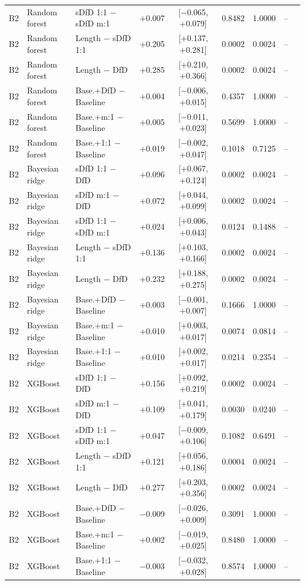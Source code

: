 \begin{longtable}{lllcccccc}
B2 & Random forest & sDfD 1:1 $-$ sDfD m:1 & +0.007 & [$-$0.065, +0.079] & 0.8482 & 1.0000 & -- \\
B2 & Random forest & Length $-$ sDfD 1:1 & +0.205 & [+0.137, +0.281] & 0.0002 & 0.0024 & -- \\
B2 & Random forest & Length $-$ DfD & +0.285 & [+0.210, +0.366] & 0.0002 & 0.0024 & -- \\
B2 & Random forest & Base.+DfD $-$ Baseline & +0.004 & [$-$0.006, +0.015] & 0.4357 & 1.0000 & -- \\
B2 & Random forest & Base.+m:1 $-$ Baseline & +0.005 & [$-$0.011, +0.023] & 0.5699 & 1.0000 & -- \\
B2 & Random forest & Base.+1:1 $-$ Baseline & +0.019 & [$-$0.002, +0.047] & 0.1018 & 0.7125 & -- \\
B2 & Bayesian ridge & sDfD 1:1 $-$ DfD & +0.096 & [+0.067, +0.124] & 0.0002 & 0.0024 & -- \\
B2 & Bayesian ridge & sDfD m:1 $-$ DfD & +0.072 & [+0.044, +0.099] & 0.0002 & 0.0024 & -- \\
B2 & Bayesian ridge & sDfD 1:1 $-$ sDfD m:1 & +0.024 & [+0.006, +0.043] & 0.0124 & 0.1488 & -- \\
B2 & Bayesian ridge & Length $-$ sDfD 1:1 & +0.136 & [+0.103, +0.166] & 0.0002 & 0.0024 & -- \\
B2 & Bayesian ridge & Length $-$ DfD & +0.232 & [+0.188, +0.275] & 0.0002 & 0.0024 & -- \\
B2 & Bayesian ridge & Base.+DfD $-$ Baseline & +0.003 & [$-$0.001, +0.007] & 0.1666 & 1.0000 & -- \\
B2 & Bayesian ridge & Base.+m:1 $-$ Baseline & +0.010 & [+0.003, +0.017] & 0.0074 & 0.0814 & -- \\
B2 & Bayesian ridge & Base.+1:1 $-$ Baseline & +0.010 & [+0.002, +0.017] & 0.0214 & 0.2354 & -- \\
B2 & XGBoost & sDfD 1:1 $-$ DfD & +0.156 & [+0.092, +0.219] & 0.0002 & 0.0024 & -- \\
B2 & XGBoost & sDfD m:1 $-$ DfD & +0.109 & [+0.041, +0.179] & 0.0030 & 0.0240 & -- \\
B2 & XGBoost & sDfD 1:1 $-$ sDfD m:1 & +0.047 & [$-$0.009, +0.106] & 0.1082 & 0.6491 & -- \\
B2 & XGBoost & Length $-$ sDfD 1:1 & +0.121 & [+0.056, +0.186] & 0.0004 & 0.0024 & -- \\
B2 & XGBoost & Length $-$ DfD & +0.277 & [+0.203, +0.356] & 0.0002 & 0.0024 & -- \\
B2 & XGBoost & Base.+DfD $-$ Baseline & $-$0.009 & [$-$0.026, +0.009] & 0.3091 & 1.0000 & -- \\
B2 & XGBoost & Base.+m:1 $-$ Baseline & +0.002 & [$-$0.019, +0.025] & 0.8480 & 1.0000 & -- \\
B2 & XGBoost & Base.+1:1 $-$ Baseline & $-$0.003 & [$-$0.032, +0.028] & 0.8574 & 1.0000 & -- \\
\bottomrule
\end{longtable}